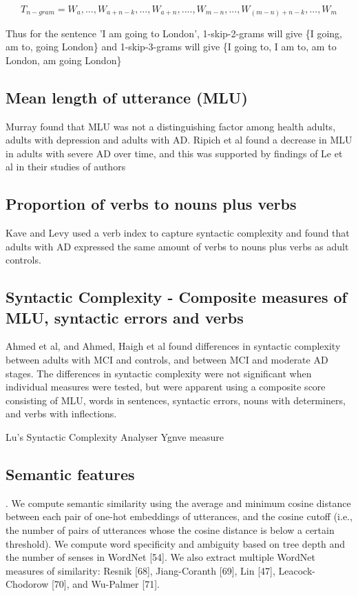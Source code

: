 \documentclass[10pt, letterpaper, twoside, openany]{thesis}
\begin{document}
\begin{equation} \label{x4}
T_{n-gram} = {W_{a},...,W_{a+n-k},..., W_{a+n},....,W_{m-n},...,W_{(m-n)+n-k},...,W_{m}}
\end{equation}

Thus for the sentence 'I am going to London', 1-skip-2-grams will give \{I going, am to, going London\} and 1-skip-3-grams will give \{I going to, I am to, am to London, am going London\}

\subsection{Mean length of utterance (MLU)}
Murray found that MLU was not a distinguishing factor among health adults, adults with depression and adults with AD. Ripich et al found a decrease in MLU in adults with severe AD over time, and this was supported by findings of Le et al in their studies of authors \cite{Le2012} \newline
\par 
\subsection{Proportion of verbs to nouns plus verbs}
Kave and Levy used a verb index to capture syntactic complexity and found that adults with AD expressed the same amount of verbs to nouns plus verbs as adult controls. \newline
\par 
\subsection{Syntactic Complexity - Composite measures of MLU, syntactic errors and verbs}
Ahmed et al, and Ahmed, Haigh et al found differences in syntactic complexity between adults with MCI and controls, and between MCI and moderate AD stages. The differences in syntactic complexity were not significant when individual measures were tested, but were apparent using a composite score consisting of MLU, words in sentences, syntactic errors, nouns with determiners, and verbs with inflections. \newline
\par
Lu's Syntactic Complexity Analyser
Ygnve measure

\subsection{Semantic features}. We compute semantic similarity using the average and minimum cosine distance between each pair of one-hot embeddings of utterances, and the cosine cutoff (i.e., the number of pairs of utterances whose the cosine distance is below a certain threshold). We compute word specificity and ambiguity based on tree depth and the number of senses in WordNet [54]. We also extract multiple WordNet measures of similarity: Resnik [68], Jiang-Coranth [69], Lin [47], Leacock-Chodorow [70], and Wu-Palmer [71].
\end{document}
